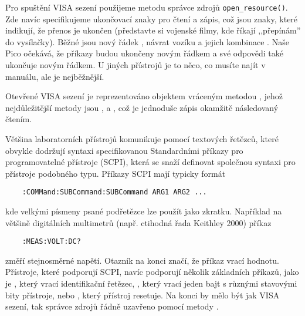Pro spuštění VISA sezení použijeme metodu správce zdrojů \lstinline|open_resource()|. Zde navíc specifikujeme ukončovací znaky pro čtení a zápis, což jsou znaky, které indikují, že přenos je ukončen (představte si vojenské filmy, kde říkají ,,přepínám'' do vysílačky). Běžné jsou nový řádek , návrat vozíku  a jejich kombinace . Naše Pico očekává, že příkazy budou ukončeny novým řádkem  a své odpovědi také ukončuje novým řádkem. U jiných přístrojů je to něco, co musíte najít v manuálu, ale  je nejběžnější.

Otevřené VISA sezení je reprezentováno objektem  vráceným metodou , jehož nejdůležitější metody jsou ,  a , což je jednoduše zápis okamžitě následovaný čtením.

Většina laboratorních přístrojů komunikuje pomocí textových řetězců, které obvykle dodržují syntaxi specifikovanou Standardními příkazy pro programovatelné přístroje (SCPI), která se snaží definovat společnou syntaxi pro přístroje podobného typu. Příkazy SCPI mají typicky formát
\begin{lstlisting}
    :COMMand:SUBCommand:SUBCommand ARG1 ARG2 ...
\end{lstlisting}
kde velkými písmeny psané podřetězce lze použít jako zkratku. Například na většině digitálních multimetrů (např. ctihodná řada Keithley 2000) příkaz
\begin{lstlisting}
    :MEAS:VOLT:DC?
\end{lstlisting}
změří stejnosměrné napětí. Otazník na konci značí, že příkaz vrací hodnotu. Přístroje, které podporují SCPI, navíc podporují několik základních příkazů, jako je , který vrací identifikační řetězec, , který vrací jeden bajt s různými stavovými bity přístroje, nebo , který přístroj resetuje. Na konci by mělo být jak VISA sezení, tak správce zdrojů řádně uzavřeno pomocí metody .

